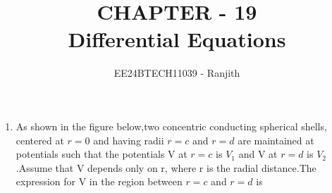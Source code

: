 \documentclass[journal]{IEEEtran}
\begin{document}

\onecolumn
\title{CHAPTER - 19\\Differential Equations}
\author{EE24BTECH11039 - Ranjith}
\maketitle
\begin {enumerate}
\item As shown in the figure below,two concentric conducting spherical shells, centered at $r=0 $ and having radii  $r=c$ and $r=d $ are maintained at potentials such that the potentials V at $r=c$ is $V_1$ and V at $r =d$ is $V_2$.Assume that V depends only on r, where r is the radial distance.The expression for V in the region between $r=c$ and $r=d$ is 

\begin{figure}[h]
\centering
{}%


\end{figure}


\end{enumerate}
\end{document}
